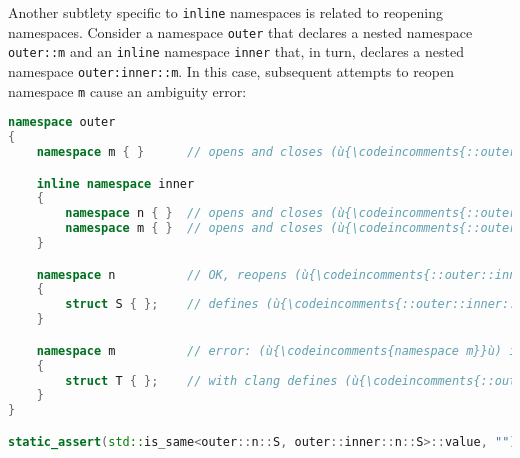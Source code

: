 Another subtlety specific to \texttt{inline} namespaces is related to
reopening namespaces. Consider a namespace \texttt{outer} that declares
a nested namespace \texttt{outer::m} and an \texttt{inline}
namespace \texttt{inner} that, in turn, declares a nested namespace
\texttt{outer:inner::m}. In this case, subsequent attempts to reopen
namespace \texttt{m} cause an ambiguity error:

\begin{lstlisting}[language=C++]
namespace outer
{
    namespace m { }      // opens and closes (ù{\codeincomments{::outer::m}}ù)

    inline namespace inner
    {
        namespace n { }  // opens and closes (ù{\codeincomments{::outer::inner::n}}ù)
        namespace m { }  // opens and closes (ù{\codeincomments{::outer::inner::m}}ù)
    }

    namespace n          // OK, reopens (ù{\codeincomments{::outer::inner::n}}ù)
    {
        struct S { };    // defines (ù{\codeincomments{::outer::inner::n::S}}ù)
    }

    namespace m          // error: (ù{\codeincomments{namespace m}}ù) is ambiguous
    {
        struct T { };    // with clang defines (ù{\codeincomments{::outer::m::T}}ù)
    }
}

static_assert(std::is_same<outer::n::S, outer::inner::n::S>::value, "");
\end{lstlisting}

